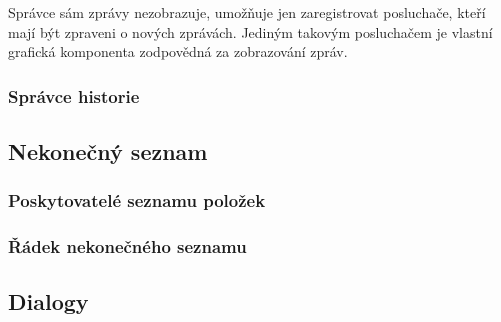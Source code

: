 Správce sám zprávy nezobrazuje, umožňuje jen zaregistrovat posluchače, kteří mají být zpraveni o nových zprávách.
Jediným takovým posluchačem je vlastní grafická komponenta zodpovědná za zobrazování zpráv.


\subsubsection{Správce historie}

\subsection{Nekonečný seznam}

\subsubsection{Poskytovatelé seznamu položek}

\subsubsection{Řádek nekonečného seznamu}

\subsection{Dialogy}
